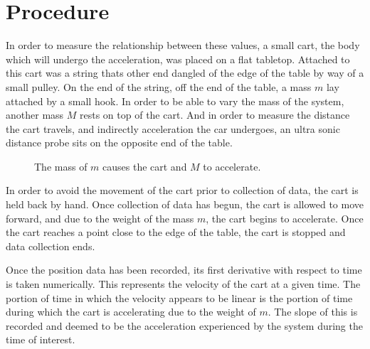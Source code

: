 \documentclass[11pt]{article}
\begin{document}
\section{Procedure}
In order to measure the relationship between these values, a small cart, the body which will undergo the acceleration, was placed on a flat tabletop. Attached to this cart was a string thats other end dangled of the edge of the table by way of a small pulley. On the end of the string, off the end of the table, a mass \(m\) lay attached by a small hook. In order to be able to vary the mass of the system,	 another mass \(M\) rests on top of the cart. And in order to measure the distance the cart travels, and indirectly acceleration the car undergoes, an ultra sonic distance probe sits on the opposite end of the table.

\begin{figure}[h]
	\centering
{}
\caption{The mass of \(m\) causes the cart and \(M\) to accelerate. }
\end{figure}

In order to avoid the movement of the cart prior to collection of data, the cart is held back by hand. Once collection of data has begun, the cart is allowed to move forward, and due to the weight of the mass \(m\), the cart begins to accelerate. Once the cart reaches a point close to the edge of the table, the cart is stopped and data collection ends.

Once the position data has been recorded, its first derivative with respect to time is taken numerically. This represents the velocity of the cart at a given time. The portion of time in which the velocity appears to be linear is the portion of time during which the cart is accelerating due to the weight of \(m\). The slope of this is recorded and deemed to be the acceleration experienced by the system during the time of interest.
\end{document}
